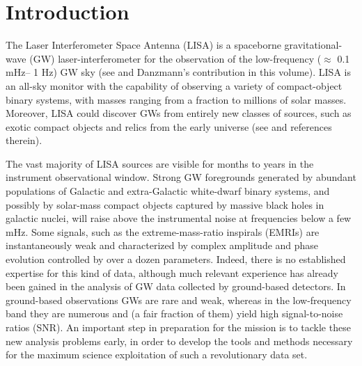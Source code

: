 \documentclass[12pt]{iopart}
\begin{document}

\section{Introduction}
\label{s:intro}

The Laser Interferometer Space Antenna (LISA) is a spaceborne gravitational-wave (GW) laser-interferometer for the observation of the low-frequency  ($\approx$ 0.1 mHz-- 1 Hz) GW sky (see \cite{lisappa} and Danzmann's contribution in this volume). LISA is an all-sky monitor with the capability of observing a variety of compact-object binary systems, with masses ranging from a fraction to millions of solar masses. Moreover, LISA could discover GWs from entirely new classes of sources, such as exotic compact objects and relics from the early universe (see \cite{ScienceCase,CT2002} and references therein).

The vast majority of LISA sources are visible for months to years in the instrument observational window. Strong GW foregrounds generated by abundant populations of Galactic and extra-Galactic white-dwarf binary systems, and possibly by solar-mass compact objects captured by massive black holes in galactic nuclei, will raise above the instrumental noise at frequencies below a few mHz. Some signals, such as the extreme-mass-ratio inspirals (EMRIs) are instantaneously weak and characterized by complex amplitude and phase evolution controlled by over a dozen parameters. Indeed, there is no established expertise for this kind of data, although much relevant experience has already been gained in the analysis of GW data collected by ground-based detectors. In ground-based observations GWs are rare and weak, whereas in the low-frequency band they are numerous and (a fair fraction of them) yield high signal-to-noise ratios (SNR). An important step in preparation for the mission is to tackle these new analysis problems early, in order to develop the tools and methods necessary for the maximum science exploitation of such a revolutionary data set.
\end{document}
